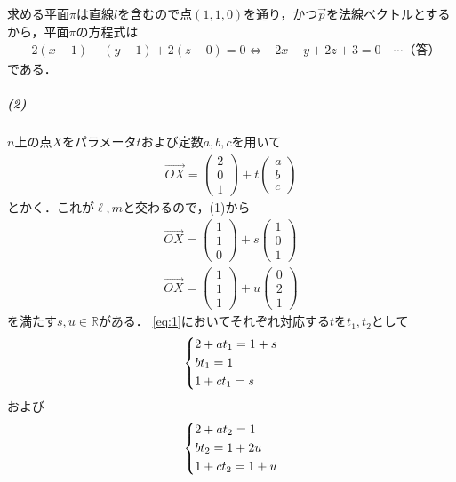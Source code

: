 \documentclass[../../main.tex]{subfiles}
\begin{document}
求める平面$\pi$は直線$l$を含むので点$(1,1,0)$を通り，かつ$\vec{p}$を法線ベクトルとするから，平面$\pi$の方程式は
\begin{align}
  -2(x-1) - (y-1) + 2(z-0) = 0 \iff -2x - y + 2z + 3 = 0 \quad \cdots\text{（答）}
\end{align}
である．

\subparagraph{(2)}

$n$上の点$X$をパラメータ$t$および定数$a,b,c$を用いて
\begin{align}
  \overrightarrow{OX} =
  \begin{pmatrix} 2 \\ 0 \\ 1
  \end{pmatrix}
  + t
  \begin{pmatrix} a \\ b \\ c
  \end{pmatrix} \label{eq:1}
\end{align}
とかく．これが$\ell,m$と交わるので，(1)から
\begin{align}
  \overrightarrow{OX} =
  \begin{pmatrix} 1 \\ 1 \\ 0
  \end{pmatrix}
  + s
  \begin{pmatrix} 1 \\ 0 \\ 1
  \end{pmatrix} \label{eq:2} \\
  \overrightarrow{OX} =
  \begin{pmatrix} 1 \\ 1 \\ 1
  \end{pmatrix}
  + u
  \begin{pmatrix} 0 \\ 2 \\ 1
  \end{pmatrix} \label{eq:3}
\end{align}
を満たす$s,u\in\mathbb{R}$がある．
\cref{eq:1}においてそれぞれ対応する$t$を$t_1,t_2$として
\begin{align}
  \begin{dcases}
    2+at_1 = 1 + s \\
    bt_1 = 1 \\
    1+ct_1 = s \label{eq:4}
  \end{dcases}
\end{align}
および
\begin{align}
  \begin{dcases}
    2+at_2 = 1  \\
    bt_2   = 1 + 2u \\
    1+ct_2 = 1 + u
  \end{dcases} \label{eq:5}
\end{align}
\end{document}
